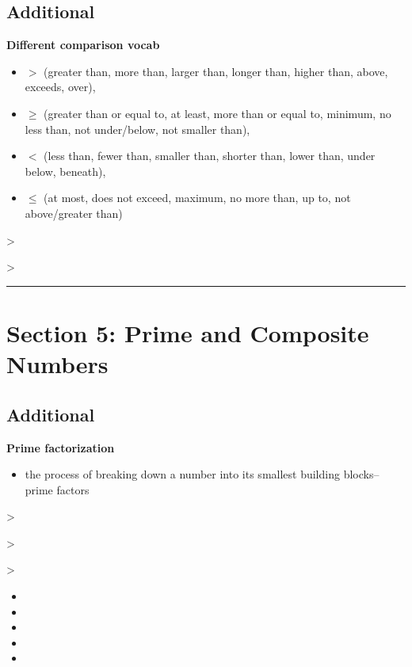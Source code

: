 \documentclass[12pt]{article}
\begin{document}
\subsection*{Additional}
\textbf{Different comparison vocab}
\begin{itemize}
  \item $>$ (greater than, more than, larger than, longer than, higher than, above, exceeds, over),
  \item $\ge$ (greater than or equal to, at least, more than or equal to, minimum, no less than, not under/below, not smaller than),
  \item $<$ (less than, fewer than, smaller than, shorter than, lower than, under below, beneath),
  \item $\le$ (at most, does not exceed, maximum, no more than, up to, not above/greater than)
\end{itemize}

\noindent\textgreater\ 

\noindent\textgreater\ 

\bigskip
\hrule
\bigskip

\section*{Section 5: Prime and Composite Numbers}

\subsection*{Additional}
\textbf{Prime factorization}
\begin{itemize}
  \item the process of breaking down a number into its smallest building blocks--prime factors
\end{itemize}

\noindent\textgreater\ 

\noindent\textgreater\ 

\noindent\textgreater\ 
\begin{itemize}
  \item {}
  \item {}
  \item {}
  \item {}
  \item {}
\end{itemize}
\end{document}

